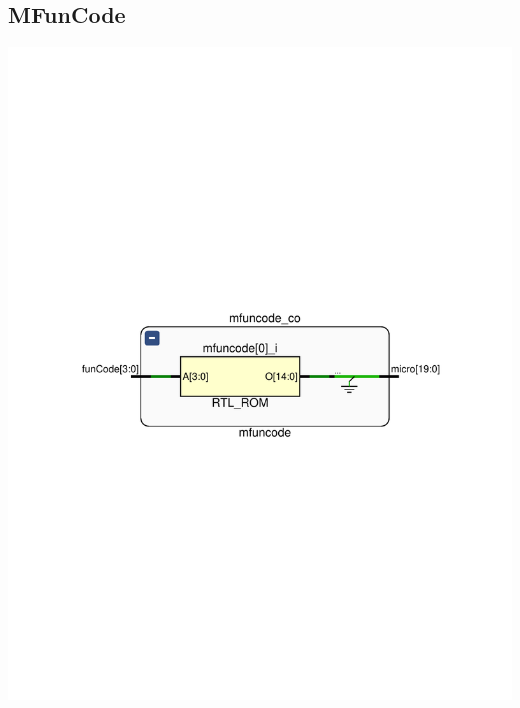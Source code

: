 \documentclass[8pt,executivepaper]{article}
\begin{document}
\subsection{MFunCode}
\begin{center}
  \includegraphics[scale=0.75]{rtl/mfuncode.pdf}
\end{center}
\end{document}
